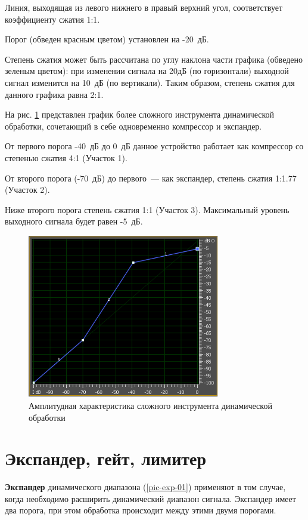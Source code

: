 \documentclass[oneside, final, 14pt]{extreport}
\begin{document}
Линия, выходящая из левого нижнего в правый верхний угол, соответствует коэффициенту сжатия 1:1.

Порог (обведен красным цветом) установлен на -20~дБ.

Степень сжатия может быть рассчитана по углу наклона части графика (обведено зеленым цветом): при изменении сигнала на 20дБ (по горизонтали) выходной сигнал изменится на 10~дБ (по вертикали). Таким образом, степень сжатия для данного графика равна 2:1.

На рис. \ref{pic-amp-02}  представлен график более сложного инструмента динамической обработки, сочетающий в себе одновременно компрессор и экспандер.

От первого порога -40~дБ до 0~дБ данное устройство работает как компрессор со степенью сжатия 4:1 (Участок 1).

От второго порога (-70~дБ) до первого~--- как экспандер, степень сжатия 1:1.77 (Участок 2).

Ниже второго порога степень сжатия 1:1 (Участок 3). Максимальный уровень выходного сигнала будет равен -5~дБ.

\begin{figure}[h!]
  \centering
  \includegraphics[width=0.75\textwidth]{pic-amp-02}
  \caption{Амплитудная характеристика сложного инструмента динамической обработки}
  \label{pic-amp-02}
\end{figure}

\section{Экспандер, гейт, лимитер}
\textbf{Экспандер} динамического диапазона (\ref{pic-exp-01}) применяют в том случае, когда необходимо расширить динамический диапазон сигнала. Экспандер имеет два порога, при этом обработка происходит между этими двумя порогами.
\end{document}

